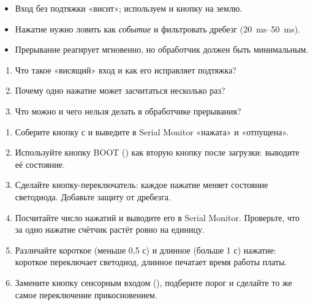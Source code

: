 \begin{summary}
\begin{itemize}[leftmargin=*]
  \item Вход без подтяжки «висит»; используем  и кнопку на землю.
  \item Нажатие нужно ловить как \emph{событие} и фильтровать дребезг (\SIrange{20}{50}{ms}).
  \item Прерывание реагирует мгновенно, но обработчик должен быть минимальным.
\end{itemize}
\end{summary}

\begin{selfcheck}
\begin{enumerate}
  \item Что такое «висящий» вход и как его исправляет подтяжка?
  \item Почему одно нажатие может засчитаться несколько раз?
  \item Что можно и чего нельзя делать в обработчике прерывания?
\end{enumerate}
\end{selfcheck}

\begin{tasks}
\begin{enumerate}
\item {} Соберите кнопку с  и выведите в Serial Monitor «нажата» и «отпущена».
\item {} Используйте кнопку BOOT () как вторую кнопку после загрузки: выводите её состояние.
\item {} Сделайте кнопку-переключатель: каждое нажатие меняет состояние светодиода. Добавьте защиту от дребезга.
\item {} Посчитайте число нажатий и выводите его в Serial Monitor. Проверьте, что за одно нажатие счётчик растёт ровно на единицу.
\item {} Различайте короткое (меньше 0,5 с) и длинное (больше 1 с) нажатие: короткое переключает светодиод, длинное печатает время работы платы.
\item {} Замените кнопку сенсорным входом (), подберите порог и сделайте то же самое переключение прикосновением.
\end{enumerate}
\end{tasks}
